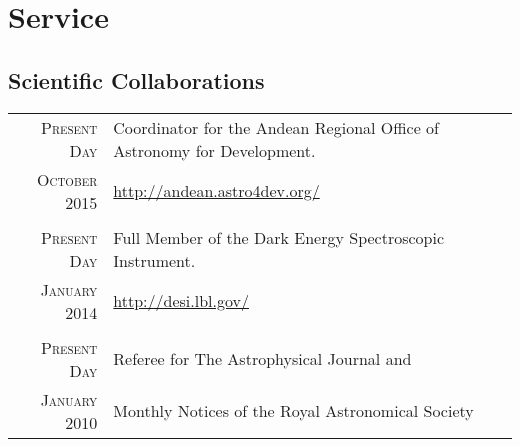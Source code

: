 \documentclass[a4paper,10pt]{article} %
\begin{document}



\color{red}
\section{Service}
\color{black}
\subsection{Scientific Collaborations}

\begin{tabular}{rl}	
 \textsc{Present Day} &  Coordinator for the Andean Regional Office of  Astronomy for Development.\\
 \textsc{October 2015} & \url{http://andean.astro4dev.org/}\\
& \\
 \textsc{Present Day} &  Full Member of the Dark Energy Spectroscopic Instrument.\\
 \textsc{January 2014} & \url{http://desi.lbl.gov/}\\
& \\ 
\textsc{Present Day} & Referee for The Astrophysical Journal and \\
\textsc{January 2010} & Monthly Notices of the Royal Astronomical
Society\\
\end{tabular}
\end{document}
